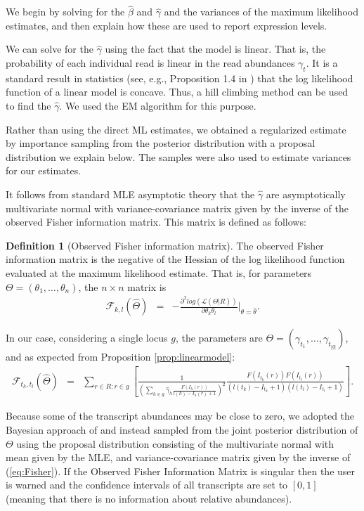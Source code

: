 \documentclass[12pt]{amsart}
\theoremstyle{definition}
\newtheorem{defn}[thm]{Definition}
\begin{document}
We begin by solving for the $\hat{\beta}$ and $\hat{\gamma}$ and the variances
of the maximum likelihood estimates, and then explain how these are used to
report expression levels.

We can solve for the $\hat{\gamma}$ using the fact that the model is linear.
That is, the probability of each individual read is linear in the read
abundances $\gamma_t$. It is a standard result in statistics (see, e.g.,
Proposition 1.4 in \cite{ASCB2005}) that the log likelihood function of a
linear model is concave. Thus, a hill climbing method can be used to find the
$\hat{\gamma}$. We used the EM algorithm for this purpose.

Rather than using the direct ML estimates, we obtained a regularized
estimate by importance sampling from the posterior distribution with a
proposal distribution we explain below. The samples were also used to estimate
variances for our estimates. 

It follows from standard MLE asymptotic
theory that the $\hat{\gamma}$ are asymptotically multivariate normal with
variance-covariance matrix given by the inverse of the observed Fisher
information matrix. This matrix is defined as follows:

\begin{defn}[Observed Fisher information matrix]
The observed Fisher information matrix is the negative of the Hessian of the log likelihood function evaluated at the maximum likelihood estimate. That is, for parameters $\Theta=(\theta_1,\ldots,\theta_n)$, the $n \times n$ matrix is
\begin{eqnarray}
\mathcal{F}_{k,l}(\hat{\Theta}) & = & - \frac{\partial^2 log(\mathcal{L}(\Theta|R))}{\partial \theta_k \theta_l} |_{\theta=\hat{\theta}}.
\end{eqnarray}
\end{defn}
In our case, considering a single locus $g$, the parameters are $\Theta = (\gamma_{t_1},\ldots,\gamma_{t_{|g|}})$, and as expected from Proposition \ref{prop:linearmodel}:
\begin{eqnarray}
\label{eq:Fisher}
\mathcal{F}_{t_k,t_l}(\hat{\Theta}) & = & \sum_{r \in R:r \in g}
\left[ \frac{1}{\left( \sum_{h \in g}  \hat{\gamma}_h \frac{F(I_h(r))}{l(h) - I_h(r)+1} \right)^2} \frac{F(I_{t_k}(r)) F(I_{t_l}(r)) }{(l(t_k)-I_{t_k}+1)(l(t_l)-I_{t_l}+1)} \right].
\end{eqnarray}


Because some of the transcript abundances may be close to zero, we
adopted the
Bayesian approach of \cite{Jiang2009} and instead sampled from the
joint posterior distribution of $\Theta$ using the proposal
distribution consisting of the multivariate normal with mean
given by the MLE, and variance-covariance matrix given by the inverse of
(\ref{eq:Fisher}). If the Observed Fisher Information Matrix is
singular then the user is warned and the confidence intervals of all
transcripts are set to $[0,1]$ (meaning that there is no information
about relative abundances).
\end{document}
